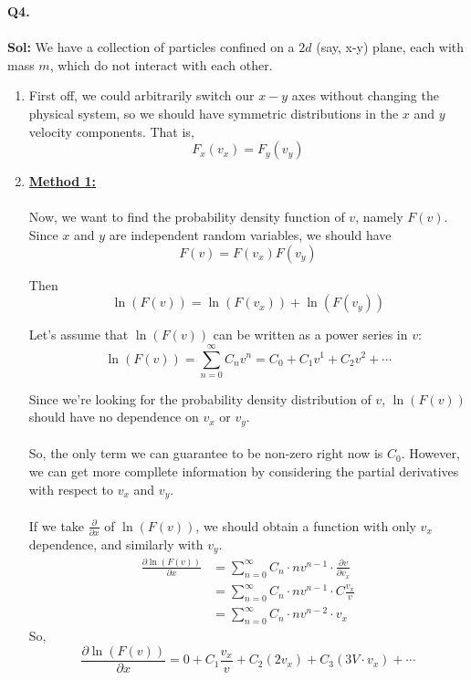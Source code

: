 \documentclass[twoside]{article}
\begin{document}
\textbf{Q4.} 
\\
\\
\textbf{Sol:} 
We have a collection of particles confined on a $2d$ (say, x-y) plane, each with mass $m$, which do not interact with each other.
\begin{enumerate}[label=(\alph*)]
   \item First off, we could arbitrarily switch our $x-y$ axes without changing the physical system, so we should have symmetric distributions in the $x$ and $y$ velocity components. That is,
   \[ \boxed{F_x(v_x) = F_y(v_y)} \]

   \item \underline{\textbf{Method 1:}}
   \\
   \\
   Now, we want to find the probability density function of $v$, namely $F(v)$. Since $x$ and $y$ are independent random variables, we should have 
   \[ F(v) = F(v_x)F(v_y) \]

   Then 
   \[ \ln(F(v)) = \ln(F(v_x)) + \ln(F(v_y)) \]

   Let's assume that $\ln(F(v))$ can be written as a power series in $v$:
   \[ \boxed{\ln(F(v)) = \sum_{n=0}^{\infty} C_n v^n = C_0 + C_1 v^1 + C_2 v^2 + \cdots} \]

   Since we're looking for the probability density distribution of $v$, $\ln(F(v))$ should have no dependence on $v_x$ or $v_y$. 
   \\
   \\
   So, the only term we can guarantee to be non-zero right now is $C_0$. However, we can get more compllete information by considering the partial derivatives with respect to $v_x$ and $v_y$.
   \\
   \\
   If we take $\frac{\partial}{\partial x}$ of $\ln(F(v))$, we should obtain a function with only $v_x$ dependence, and similarly with $v_y$.
   \begin{align*}
      \frac{\partial \ln(F(v))}{\partial x} &= \sum_{n = 0}^{\infty} C_n \cdot nv^{n-1} \cdot \frac{\partial v}{\partial  v_x} \\
      &= \sum_{n = 0}^{\infty} C_n \cdot nv^{n-1} \cdot C\frac{v_x}{v} \\ 
      &= \sum_{n = 0}^{\infty} C_n \cdot nv^{n-2} \cdot v_x
   \end{align*}
   So,
   \[ \boxed{ \frac{\partial \ln(F(v))}{\partial x} = 0 + C_1 \frac{v_x}{v} + C_2 (2v_x) + C_3 (3V \cdot v_x) + \cdots} \]
   

\end{enumerate}
\end{document}
